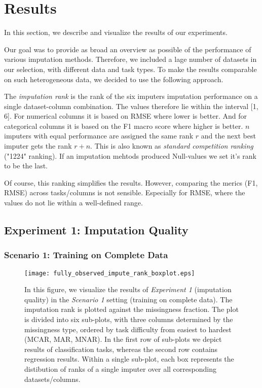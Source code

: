 \section{Results}
\label{sec:results}

In this section, we describe and visualize the results of our experiments.

Our goal was to provide as broad an overview as possible of the performance of various imputation methods. Therefore, we included a lage number of datasets in our selection, with different data and task types. To make the results comparable on such heterogeneous data, we decided to use the following approach.

The \textit{imputation rank} is the rank of the six imputers imputation performance on a single dataset-column combination. The values therefore lie within the interval [1, 6]. For numerical columns it is based on RMSE where lower is better. And for categorical columns it is based on the F1 macro score where higher is better. $n$ imputers with equal performance are assigned the same rank $r$ and the next best imputer gets the rank $r+n$. This is also known as \textit{standard competition ranking} ("1224" ranking). If an imputation mehtods produced Null-values we set it's rank to be the last.

Of course, this ranking simplifies the results. However, comparing the merics (F1, RMSE) across tasks/columns is not sensible. Especially for RMSE, where the values do not lie within a well-defined range.




\subsection{Experiment 1: Imputation Quality}


\subsubsection{Scenario 1: Training on Complete Data}


\begin{figure}\centering
    \texttt{[image: fully\_observed\_impute\_rank\_boxplot.eps]}
    \caption[Imputation Ranks - Fully Observed]{In this figure, we visualize the results of \textit{Experiment 1} (imputation quality) in the \textit{Scenario 1} setting (training on complete data). The imputation rank is plotted against the missingness fraction. The plot is divided into six sub-plots, with three columns determined by the missingness type, ordered by task difficulty from easiest to hardest (MCAR, MAR, MNAR). In the first row of sub-plots we depict results of classification tasks, whereas the second row contains regression results. Within a single sub-plot, each box represents the distibution of ranks of a single imputer over all corresponding datasets/columns.}\label{fig:fully_observed_impute_rank_boxplot}
\end{figure}

